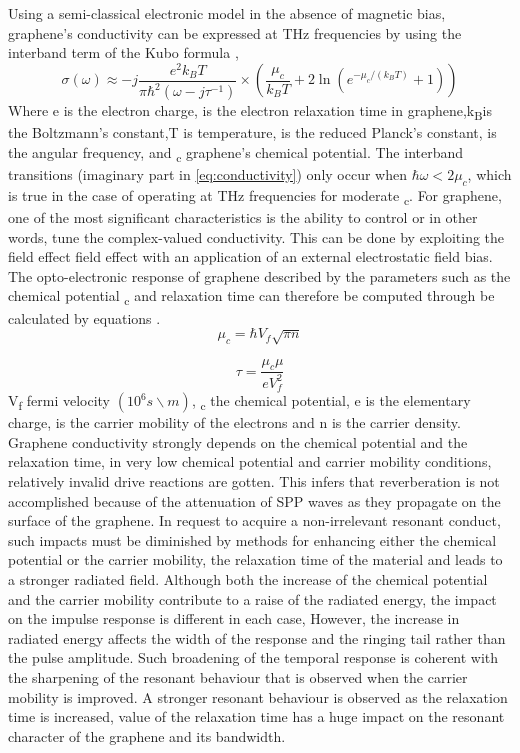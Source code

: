 \documentclass[12pt]{suhbook}
\begin{document}
Using a semi-classical electronic model in the absence of magnetic bias, graphene’s conductivity can be expressed at THz frequencies by using the interband term of the Kubo formula \cite{tamagnone2012analysis},
% 
\begin{equation} 
\sigma \left( \omega \right) \approx -j \frac{{e}^{2} k_{B} T}{\pi \hbar^{2}(\omega - j \tau^{-1})}  \times\left(\frac{\mu_{c}}{k_{B} T} + 2 \ln \left(e^{-\mu_{c} /\left(k_{B} T\right)}+1\right)\right) 
\label{eq:conductivity}
\end{equation}
Where \si{e} is the electron charge,\si{\tau} is the electron relaxation time in graphene,\si{k_B}is the Boltzmann’s constant,\si{T} is temperature,\si{\hbar} is the reduced Planck’s constant, \si{\omega} is the angular frequency, and \si{\mu_c} graphene’s chemical potential. The interband transitions (imaginary part in \eqref{eq:conductivity}) only occur when $\hbar\omega < 2\mu_c$, which is true in the case of operating at THz frequencies for moderate \si{\mu_c}. For graphene, one of the most significant characteristics is the ability to control or in other words, tune the complex-valued conductivity. This can be done by exploiting the field effect field effect with an application of an external electrostatic field bias. The opto-electronic response of graphene described by the parameters such as the chemical potential \si{\mu_c} and relaxation time \si{\tau} can therefore be computed through be calculated by equations \cite{abadal2015time}. 
\begin{equation}
\mu_c=\hbar V_f\sqrt{\pi n}
\label{eq:chemical}
\end{equation}

\begin{equation}
\tau=\frac{\mu_c\mu}{e V^2_f}
\label{eq:relax time}
\end{equation}
\si{V_f} fermi velocity $(10^6 s\backslash m)$, \si{\mu_c} the chemical potential, \si{e} is the elementary charge,\si{\mu} is the carrier mobility of the electrons and \si{n} is the carrier density. Graphene conductivity strongly depends on the chemical potential and the relaxation time, in very low chemical potential and carrier mobility conditions, relatively invalid drive reactions are gotten. This infers that reverberation is not accomplished because of the attenuation of SPP waves as they propagate on the surface of the graphene. In request to acquire a non-irrelevant resonant conduct, such impacts must be diminished by methods for enhancing either the chemical potential or the carrier mobility, the relaxation time of the material and leads to a stronger radiated field. 
Although both the increase of the chemical potential and the carrier mobility contribute to a raise of the radiated energy, the impact on the impulse response is different in each case, However, the increase in radiated energy affects the width of the response and the ringing tail rather than the pulse amplitude. Such broadening of the temporal response is coherent with the sharpening of the resonant behaviour that is observed when the carrier mobility is improved. A stronger resonant behaviour is observed as the relaxation time is increased, value of the relaxation time \si{\tau} has a huge impact on the resonant character of the graphene and its bandwidth.
\end{document}
